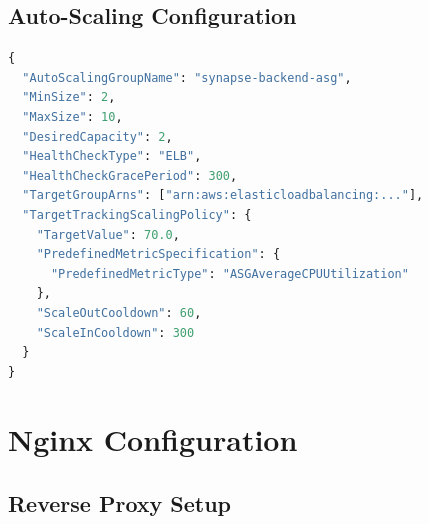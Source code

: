 \documentclass{report}
\begin{document}
\section{Auto-Scaling Configuration}

\begin{lstlisting}[language=Python, caption=Auto-Scaling Policy - Backend]
{
  "AutoScalingGroupName": "synapse-backend-asg",
  "MinSize": 2,
  "MaxSize": 10,
  "DesiredCapacity": 2,
  "HealthCheckType": "ELB",
  "HealthCheckGracePeriod": 300,
  "TargetGroupArns": ["arn:aws:elasticloadbalancing:..."],
  "TargetTrackingScalingPolicy": {
    "TargetValue": 70.0,
    "PredefinedMetricSpecification": {
      "PredefinedMetricType": "ASGAverageCPUUtilization"
    },
    "ScaleOutCooldown": 60,
    "ScaleInCooldown": 300
  }
}
\end{lstlisting}

\chapter{Nginx Configuration}

\section{Reverse Proxy Setup}
\end{document}
